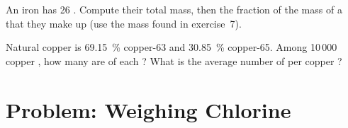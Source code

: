 \begin{exercise}[$\star\star\star$]\label{exo:g9:inside-the-atom:11}
An iron  has 26 . Compute their total mass, then the
fraction of the mass of a   that they make up (use
the mass found in exercise~7).
\end{exercise}

\begin{exercise}[$\star\star\star$]\label{exo:g9:inside-the-atom:12}
Natural copper is \qty{69.15}{\percent} copper-63 and \qty{30.85}{\percent}
copper-65. Among 10\,000 copper , how many are of each ?
What is the average number of  per copper ?
\end{exercise}

\clearpage %
\section{Problem: Weighing Chlorine}

